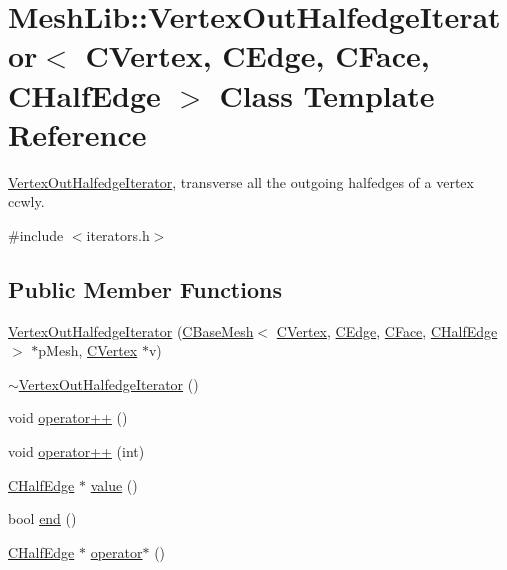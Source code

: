 \hypertarget{class_mesh_lib_1_1_vertex_out_halfedge_iterator}{}\section{Mesh\+Lib\+:\+:Vertex\+Out\+Halfedge\+Iterator$<$ C\+Vertex, C\+Edge, C\+Face, C\+Half\+Edge $>$ Class Template Reference}
\label{class_mesh_lib_1_1_vertex_out_halfedge_iterator}


\hyperlink{class_mesh_lib_1_1_vertex_out_halfedge_iterator}{Vertex\+Out\+Halfedge\+Iterator}, transverse all the outgoing halfedges of a vertex ccwly.  




{\ttfamily \#include $<$iterators.\+h$>$}

\subsection*{Public Member Functions}
\begin{DoxyCompactItemize}
\item 
\hyperlink{class_mesh_lib_1_1_vertex_out_halfedge_iterator_a3b504c6865e075c5fc2207a2a272b329}{Vertex\+Out\+Halfedge\+Iterator} (\hyperlink{class_mesh_lib_1_1_c_base_mesh}{C\+Base\+Mesh}$<$ \hyperlink{class_mesh_lib_1_1_c_vertex}{C\+Vertex}, \hyperlink{class_mesh_lib_1_1_c_edge}{C\+Edge}, \hyperlink{class_mesh_lib_1_1_c_face}{C\+Face}, \hyperlink{class_mesh_lib_1_1_c_half_edge}{C\+Half\+Edge} $>$ $\ast$p\+Mesh, \hyperlink{class_mesh_lib_1_1_c_vertex}{C\+Vertex} $\ast$v)
\item 
\hyperlink{class_mesh_lib_1_1_vertex_out_halfedge_iterator_a2e713988f1196d67270ff90228ca3ae0}{$\sim$\+Vertex\+Out\+Halfedge\+Iterator} ()
\item 
void \hyperlink{class_mesh_lib_1_1_vertex_out_halfedge_iterator_a489af79d18d963ef7bc72ba724fc4610}{operator++} ()
\item 
void \hyperlink{class_mesh_lib_1_1_vertex_out_halfedge_iterator_a38fe203aaf82b8d864081c89498a50ec}{operator++} (int)
\item 
\hyperlink{class_mesh_lib_1_1_c_half_edge}{C\+Half\+Edge} $\ast$ \hyperlink{class_mesh_lib_1_1_vertex_out_halfedge_iterator_ab9da75490e73ed2aa5a04e887673923e}{value} ()
\item 
bool \hyperlink{class_mesh_lib_1_1_vertex_out_halfedge_iterator_a1b27bbd2d05dcadcd20cd6b7494ab8b0}{end} ()
\item 
\hyperlink{class_mesh_lib_1_1_c_half_edge}{C\+Half\+Edge} $\ast$ \hyperlink{class_mesh_lib_1_1_vertex_out_halfedge_iterator_ae767df56460a5c74a48ddc42b204b682}{operator$\ast$} ()
\end{DoxyCompactItemize}


